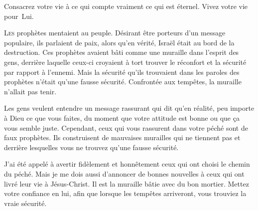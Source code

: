 Consacrez votre vie à ce qui compte vraiment
 \ocadr ce qui est éternel. Vivez votre vie pour~Lui. 

\dvrule







\lettrine{L}{es} prophètes mentaient au peuple.
 Désirant être porteurs d'un message populaire, ils parlaient de paix,
 alors qu'en vérité, Israël était au bord de la destruction.
 Ces prophètes avaient bâti comme une \Og muraille \Fg{}
 dans l'esprit des gens, derrière laquelle 
 ceux-ci croyaient à tort trouver le réconfort et la sécurité par rapport
 à l'ennemi. Mais la sécurité qu'ils trouvaient dans les paroles
 des prophètes n'était qu'une fausse sécurité.
 Confrontée aux tempêtes, la \Og muraille \Fg{} n'allait pas tenir. 


Les gens veulent entendre un message rassurant qui dit
  qu'en réalité,
 peu importe à Dieu ce que vous faites, du moment que votre attitude est bonne
 ou que \c{c}a vous semble juste.
 Cependant, ceux qui vous rassurent dans votre péché sont de faux prophètes.
 Ils construisent de mauvaises murailles qui ne tiennent pas et
 derrière lesquelles 
 vous ne trouvez qu'une fausse sécurité. 

J'ai été appelé à avertir fidèlement et honnêtement ceux qui ont choisi
 le chemin du péché. Mais je me dois aussi d'annoncer de bonnes nouvelles
 à ceux qui ont livré leur vie à Jésus-Christ.
 Il est la muraille bâtie avec du bon mortier. Mettez votre confiance en lui,
 afin que lorsque les tempêtes arriveront, vous trouviez la vraie sécurité. 

